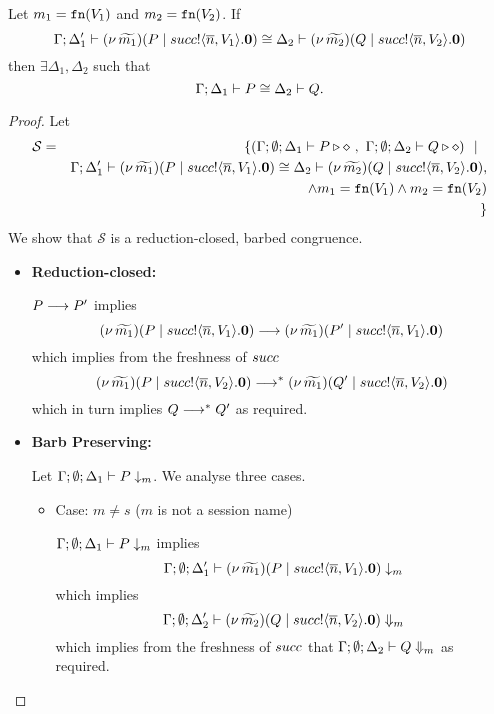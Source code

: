 
\begin{lemma}[Extrusion]\rm
	\label{lem:extrusion}
	Let $m_1 = \mathtt{fn}(V_1)$ and $m_2 = \mathtt{fn}(V_2)$. 
	If 
	\[
		\Gamma; \Delta_1' \vdash (\nu\, \widetilde{m_1})(P \;|\; succ ! \langle \overline{n}, V_1 \rangle . \mathbf{0}) \cong \Delta_2 \vdash (\nu\, \widetilde{m_2})(Q \;|\; succ ! \langle \overline{n}, V_2 \rangle . \mathbf{0})
	\]
	then $\exists \Delta_1, \Delta_2$ such that
	\[
		\Gamma; \Delta_1 \vdash P \cong \Delta_2 \vdash Q.
	\]
\end{lemma}

\begin{proof}
	\noi Let
%
	\begin{eqnarray*}
		\mathcal{S}	&=&
					\{(\Gamma; \emptyset; \Delta_1 \vdash P \triangleright \diamond\ ,\ \Gamma; \emptyset; \Delta_2 \vdash Q \triangleright \diamond) \ \ |\ \  \\
				& &	\Gamma; \Delta_1' \vdash (\nu\, \widetilde{m_1})(P \;|\; succ ! \langle \overline{n}, V_1 \rangle . \mathbf{0}) \cong \Delta_2 \vdash (\nu\, \widetilde{m_2})(Q \;|\; succ ! \langle \overline{n}, V_2 \rangle . \mathbf{0}),\\
				&&   \land m_1 = \mathtt{fn}(V_1) \land m_2 = \mathtt{fn}(V_2) \\
		&&\}
	\end{eqnarray*}
%
	\noi We show that $\mathcal{S}$ is a reduction-closed, barbed congruence.


	\begin{itemize}
		\item	{\bf Reduction-closed:}

				$P \longrightarrow P'$
				implies
				\[
					(\nu\, \widetilde{m_1})(P \;|\; succ ! \langle \overline{n}, V_1 \rangle . \mathbf{0})
					\longrightarrow
					(\nu\, \widetilde{m_1})(P' \;|\; succ ! \langle \overline{n}, V_1 \rangle . \mathbf{0})
				\]
				which implies from the freshness of $succ$
				\[
					(\nu\, \widetilde{m_1})(P \;|\; succ ! \langle \overline{n}, V_2 \rangle . \mathbf{0})
					\longrightarrow^{*}
					(\nu\, \widetilde{m_1})(Q' \;|\; succ ! \langle \overline{n}, V_2 \rangle . \mathbf{0})
				\]
				which in turn implies
				$Q \longrightarrow^{*} Q'$ as required.

	\item	{\bf Barb Preserving:}

			Let $\Gamma; \emptyset; \Delta_1 \vdash P \downarrow_{m}$. We analyse three cases.
		    \begin{itemize}
				\item	Case: $m \not= s$ ($m$ is not a session name)

						$\Gamma; \emptyset; \Delta_1 \vdash P \downarrow_{m}$
						implies
						\[
							\Gamma; \emptyset; \Delta_1' \vdash
							(\nu\, \widetilde{m_1})(P \;|\; succ ! \langle \overline{n}, V_1 \rangle . \mathbf{0})
							\downarrow_{m}
						\]
						which implies
						\[
							\Gamma; \emptyset; \Delta_2' \vdash
							(\nu\, \widetilde{m_2})(Q \;|\; succ ! \langle \overline{n}, V_2 \rangle . \mathbf{0})
							\Downarrow_{m}
						\]
						which implies from the freshness of $succ$ that
						$\Gamma; \emptyset; \Delta_2 \vdash Q \Downarrow_{m}$ as required.


\end{itemize}
\end{itemize}
\end{proof}
